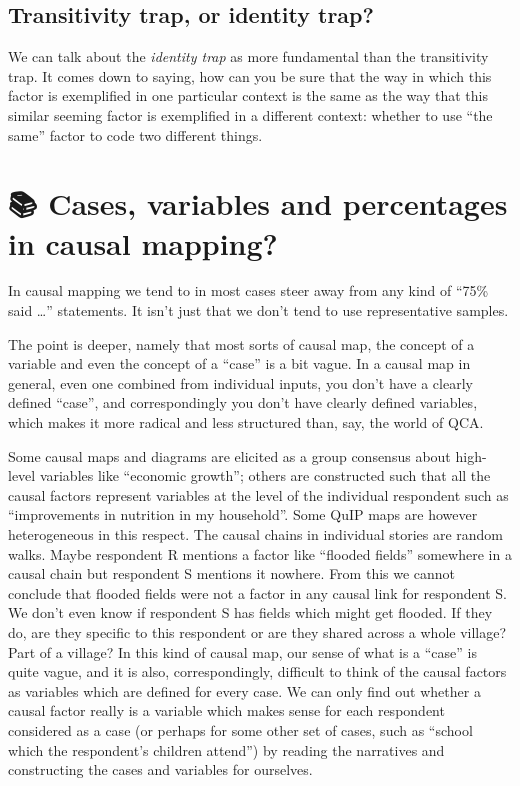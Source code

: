 \documentclass[
]{book}
\begin{document}
\hypertarget{transitivity-trap-or-identity-trap}{%
\section{Transitivity trap, or identity trap?}\label{transitivity-trap-or-identity-trap}}

We can talk about the \emph{identity trap} as more fundamental than the transitivity trap. It comes down to saying, how can you be sure that the way in which this factor is exemplified in one particular context is the same as the way that this similar seeming factor is exemplified in a different context: whether to use ``the same'' factor to code two different things.

\hypertarget{caveat-numbers}{%
\chapter{📚 Cases, variables and percentages in causal mapping?}\label{caveat-numbers}}

In causal mapping we tend to in most cases steer away from any kind of ``75\% said \ldots{}'' statements. It isn't just that we don't tend to use representative samples.

The point is deeper, namely that most sorts of causal map, the concept of a variable and even the concept of a ``case'' is a bit vague. In a causal map in general, even one combined from individual inputs, you don't have a clearly defined ``case'', and correspondingly you don't have clearly defined variables, which makes it more radical and less structured than, say, the world of QCA.

Some causal maps and diagrams are elicited as a group consensus about high-level variables like ``economic growth''; others are constructed such that all the causal factors represent variables at the level of the individual respondent such as ``improvements in nutrition in my household''. Some QuIP maps are however heterogeneous in this respect. The causal chains in individual stories are random walks. Maybe respondent R mentions a factor like ``flooded fields'' somewhere in a causal chain but respondent S mentions it nowhere. From this we cannot conclude that flooded fields were not a factor in any causal link for respondent S. We don't even know if respondent S has fields which might get flooded. If they do, are they specific to this respondent or are they shared across a whole village? Part of a village? In this kind of causal map, our sense of what is a ``case'' is quite vague, and it is also, correspondingly, difficult to think of the causal factors as variables which are defined for every case. We can only find out whether a causal factor really is a variable which makes sense for each respondent considered as a case (or perhaps for some other set of cases, such as ``school which the respondent's children attend'') by reading the narratives and constructing the cases and variables for ourselves.
\end{document}
